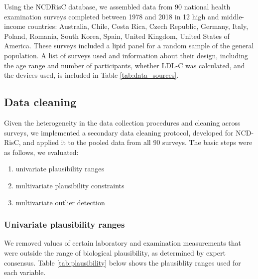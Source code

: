 \documentclass[12pt]{article}
\begin{document}
\begin{appendix}
\begin{refsection}
    Using the NCDRisC database, we assembled data from 90 national health examination surveys completed between 1978 and 2018 in 12 high and middle-income countries: Australia, Chile, Costa Rica, Czech Republic, Germany, Italy, Poland, Romania, South Korea, Spain, United Kingdom, United States of America. These surveys included a lipid panel for a random sample of the general population. A list of surveys used and information about their design, including the age range and number of participants, whether LDL-C was calculated, and the devices used, is included in Table \ref{tab:data_sources}.
    
    \begin{landscape}
    \begin{singlespace}
        
        \label{tab:data_sources}
    \end{singlespace}
    \end{landscape}


    \subsection{Data cleaning}
    Given the heterogeneity in the data collection procedures and cleaning across surveys, we implemented a secondary data cleaning protocol, developed for NCD-RisC, and applied it to the pooled data from all 90 surveys. The basic steps were as follows, we evaluated:
    \begin{enumerate}
        \item univariate plausibility ranges
        \item multivariate plausibility constraints
        \item multivariate outlier detection
    \end{enumerate}

    \subsubsection{Univariate plausibility ranges}
    We removed values of certain laboratory and examination measurements that were outside the range of biological plausibility, as determined by expert consensus. Table \ref{tab:plausibility} below shows the plausiblity ranges used for each variable.


\end{refsection}
\end{appendix}
\end{document}
